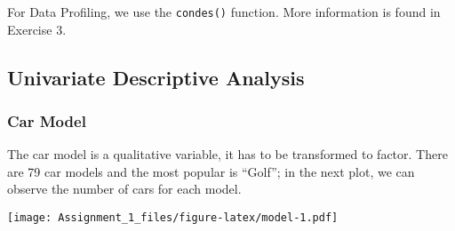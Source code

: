 \documentclass[
]{article}
\newenvironment{Shaded}{\begin{snugshade}}{\end{snugshade}}
\newcommand{\AttributeTok}[1]{\textcolor[rgb]{0.77,0.63,0.00}{#1}}
\newcommand{\CommentTok}[1]{\textcolor[rgb]{0.56,0.35,0.01}{\textit{#1}}}
\newcommand{\DecValTok}[1]{\textcolor[rgb]{0.00,0.00,0.81}{#1}}
\newcommand{\FloatTok}[1]{\textcolor[rgb]{0.00,0.00,0.81}{#1}}
\newcommand{\FunctionTok}[1]{\textcolor[rgb]{0.00,0.00,0.00}{#1}}
\newcommand{\NormalTok}[1]{#1}
\newcommand{\OtherTok}[1]{\textcolor[rgb]{0.56,0.35,0.01}{#1}}
\newcommand{\SpecialCharTok}[1]{\textcolor[rgb]{0.00,0.00,0.00}{#1}}
\newcommand{\StringTok}[1]{\textcolor[rgb]{0.31,0.60,0.02}{#1}}
\begin{document}
For Data Profiling, we use the \texttt{condes()} function. More
information is found in Exercise 3.

\hypertarget{univariate-descriptive-analysis}{%
\subsection{Univariate Descriptive
Analysis}\label{univariate-descriptive-analysis}}

\hypertarget{car-model}{%
\subsubsection{Car Model}\label{car-model}}

The car model is a qualitative variable, it has to be transformed to
factor. There are 79 car models and the most popular is ``Golf''; in the
next plot, we can observe the number of cars for each model.

\begin{Shaded}
\end{Shaded}

\texttt{[image: Assignment\_1\_files/figure-latex/model-1.pdf]}
\end{document}
